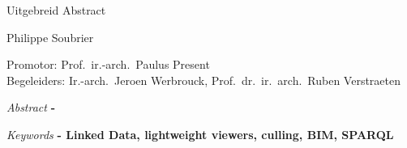 \begin{center}
    \sffamily
    \huge Uitgebreid Abstract

    \Large Philippe Soubrier

    \normalsize
    Promotor: Prof.\ ir.-arch.\ Paulus Present\\
    Begeleiders: Ir.-arch.\ Jeroen Werbrouck, Prof.\ dr.\ ir.\ arch.\ Ruben Verstraeten
\end{center}
\begin{multicols}{2}
    \small
    \emph{Abstract} \textbf{
        - \lipsum[1]
    }

    \emph{Keywords} \textbf{
        - Linked Data, lightweight viewers, culling, BIM, SPARQL
    }
    
    \lipsum[1-9]

\end{multicols}
\restoregeometry